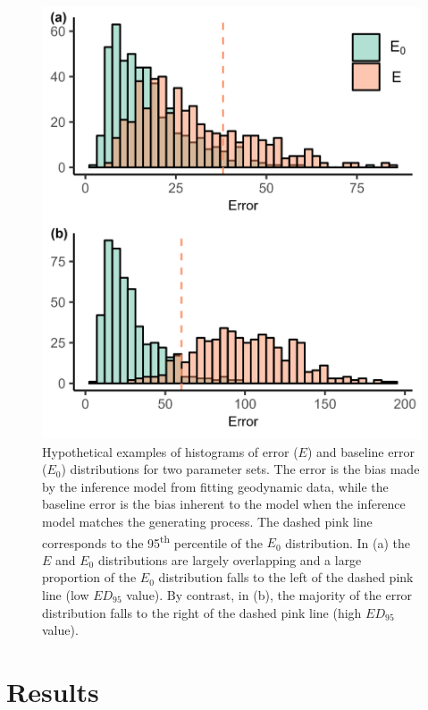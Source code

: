 \documentclass{article}
\begin{document}
\begin{figure}
    \centering
    \includegraphics{JBI-21-0508_Fig3.png}
    \caption{Hypothetical examples of histograms of error ($E$) and baseline error ($E_0$) distributions for two parameter sets. The error is the bias made by the inference model from fitting geodynamic data, while the baseline error is the bias inherent to the model when the inference model matches the generating process. The dashed pink line corresponds to the 95\textsuperscript{th} percentile of the $E_0$ distribution. In (a) the $E$ and $E_0$ distributions are largely overlapping and a large proportion of the $E_0$ distribution falls to the left of the dashed pink line (low $ED_{95}$ value). By contrast, in (b), the majority of the error distribution falls to the right of the dashed pink line (high $ED_{95}$ value).}
    \label{fig:hist_spec_nltt}
\end{figure}

\clearpage

\section*{Results}
\end{document}
